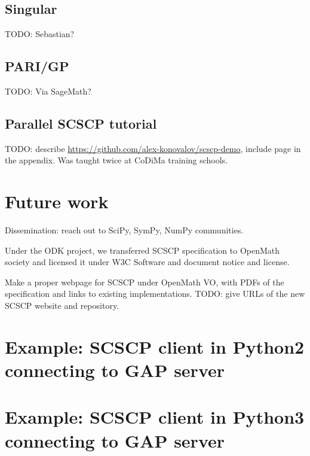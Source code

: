 \documentclass{deliverablereport}
\begin{document}
\subsection{Singular}

TODO: Sebastian?


\subsection{PARI/GP}

TODO: Via SageMath?


\subsection{Parallel SCSCP tutorial}

TODO: describe \url{https://github.com/alex-konovalov/scscp-demo},
include page in the appendix. Was taught twice at CoDiMa training schools.

\section{Future work}

Dissemination: reach out to SciPy, SymPy, NumPy communities.

Under the ODK project, we transferred SCSCP specification
to OpenMath society and licensed it under
W3C Software and document notice and license.

Make a proper webpage for SCSCP under OpenMath VO, with
PDFs of the specification and links to existing implementations.
TODO: give URLs of the new SCSCP website and repository.



\printbibliography

\appendix

\section{Example: SCSCP client in Python2 connecting to GAP server}\label{python2-to-GAP}


\section{Example: SCSCP client in Python3 connecting to GAP server}\label{python3-to-GAP}

\end{document}
